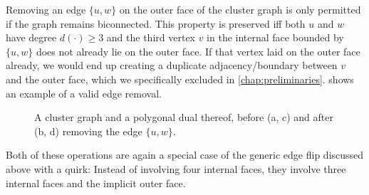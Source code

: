 Removing an edge $\{u,w\}$ on the outer face of the cluster graph is only permitted if the graph remains biconnected.
This property is preserved iff both $u$ and $w$ have degree $d(\cdot) \geq 3$ and the third vertex $v$ in the internal face bounded by $\{u,w\}$ does not already lie on the outer face.
If that vertex laid on the outer face already, we would end up creating a duplicate adjacency/boundary between $v$ and the outer face, which we specifically excluded in \cref{chap:preliminaries}.
 shows an example of a valid edge removal.

\begin{figure}[H]
	\centering
	\quad
	\qquad
	\quad
	\caption{A cluster graph and a polygonal dual thereof, before (a, c) and after (b, d) removing the edge $\{u,w\}$.}
	\label{fig:flip-edge-example-remove}
\end{figure}

Both of these operations are again a special case of the generic edge flip discussed above with a quirk:
Instead of involving four internal faces, they involve three internal faces and the implicit outer face.


